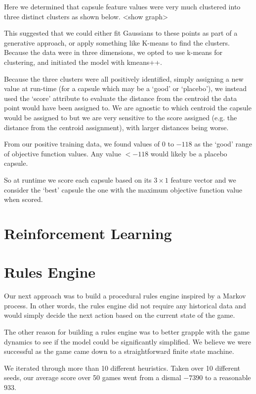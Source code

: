 \documentclass[11pt, oneside]{article}   	%
\begin{document}
Here we determined that capsule feature values were very much clustered into three distinct clusters as shown below.
<show graph>

This suggested that we could either fit Gaussians to these points as part of a generative approach, or apply something like K-means to find the clusters. Because the data were in three dimensions, we opted to use k-means for clustering, and initiated the model with kmeans++.

Because the three clusters were all positively identified, simply assigning a new value at run-time (for a capsule which may be a `good' or `placebo'), we instead used the `score' attribute to evaluate the distance from the centroid the data point would have been assigned to. We are agnostic to which centroid the capsule would be assigned to but we are very sensitive to the score assigned (e.g. the distance from the centroid assignment), with larger distances being worse.

From our positive training data, we found values of $0$ to $-118$ as the `good' range of objective function values. Any value $<-118$ would likely be a placebo capsule.

So at runtime we score each capsule based on its $3\times1$ feature vector and we consider the `best' capsule the one with the maximum objective function value when scored.

\section{Reinforcement Learning}

\section{Rules Engine}
Our next approach was to build a procedural rules engine inspired by a Markov process. In other words, the rules engine did not require any historical data and would simply decide the next action based on the current state of the game.

The other reason for building a rules engine was to better grapple with the game dynamics to see if the model could be significantly simplified. We believe we were successful as the game came down to a straightforward finite state machine. 

We iterated through more than 10 different heuristics. Taken over 10 different seeds, our average score over 50 games went from a dismal $-7390$ to a reasonable $933$.
\end{document}
